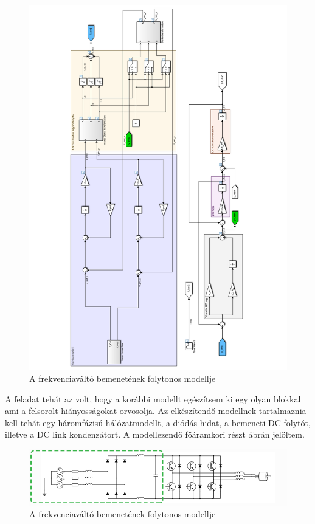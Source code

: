 \begin{figure}[]
	\centering
	\includegraphics[width = 1.2\textwidth]{figures/model_continous.pdf}
	\caption{A frekvenciaváltó bemenetének folytonos modellje} 
	\label{fig:cont_input_model}
\end{figure}

A feladat tehát az volt, hogy a korábbi modellt egészítsem ki egy olyan blokkal ami a felsorolt hiányosságokat orvosolja. Az elkészítendő modellnek tartalmaznia kell tehát egy háromfázisú hálózatmodellt, a diódás hidat, a bemeneti DC folytót, illetve a DC link kondenzátort. A modellezendő főáramkori részt  ábrán jelöltem. 

\begin{figure}[H!]
	\centering
	\includegraphics[width = \textwidth]{figures/VFDschematic_choke_marked.png}
	\caption{A frekvenciaváltó bemenetének folytonos modellje} 
	\label{fig:input_marked}
\end{figure}


